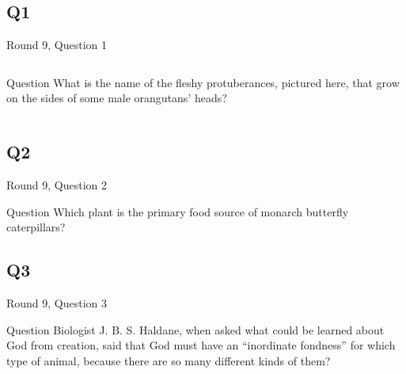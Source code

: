 \documentclass[11pt]{beamer}
\begin{document}
\subsection*{Q1}
\begin{frame}[t]{Round 9, Question 1}
\begin{columns}[T,totalwidth=\linewidth]
\begin{column}{0.32\linewidth}
\begin{block}{Question}
What is the name of the fleshy protuberances, pictured here, that grow on the sides of some male orangutans' heads?
\end{block}
\end{column}
\begin{column}{0.65\linewidth}
\begin{center}
\texttt{[image: \{Images/orangutan]}.jpg}
\end{center}
\end{column}
\end{columns}
\end{frame}
\subsection*{Q2}
\begin{frame}[t]{Round 9, Question 2}
\begin{block}{Question}
Which plant is the primary food source of monarch butterfly caterpillars?
\end{block}
\end{frame}
\subsection*{Q3}
\begin{frame}[t]{Round 9, Question 3}
\begin{block}{Question}
Biologist J. B. S. Haldane, when asked what could be learned about God from creation, said that God must have an ``inordinate fondness'' for which type of animal, because there are so many different kinds of them?
\end{block}
\end{frame}
\end{document}
